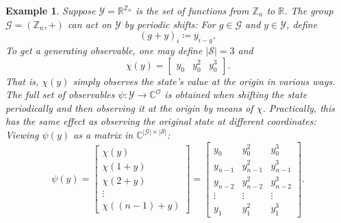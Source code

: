 \documentclass[preprint,12pt,authoryear]{elsarticle}
\newcommand{\Z}{\mathbb Z}
\newcommand{\R}{\mathbb{R}}
\newcommand{\C}{\mathbb{C}}
\newcommand\Gc{\mathcal G}
\newcommand\Oc{\mathcal O}
\newcommand\Yc{\mathcal Y}
\newcommand\Sc{\mathcal S}
\newtheorem{example}{Example}[section]%
\begin{document}
{\begin{example}
    \label{ex:generating-observable}
    Suppose $\Yc = \R^{\Z_n}$ is the set of functions from $\Z_n$ to $\R$. The group $\Gc = (\Z_n,+)$ can act on $\Yc$ by periodic shifts: For $g \in \Gc$ and $y \in \Yc$, define
    $$
        (g + y)_i \coloneqq y_{i-g},
    $$
    To get a generating observable, one may define $|\Sc| = 3$ and
    $$
        \chi(y) = \begin{bmatrix}
            y_0 & y_0^2 & y_0^3
        \end{bmatrix}.
    $$
    That is, $\chi(y)$ simply observes the state's value at the origin in various ways.
    The full set of observables $\psi : \Yc \rightarrow \C^\Oc$ is obtained when shifting the state periodically and then observing it at the origin by means of $\chi$. Practically, this has the same effect as observing the original state at different coordinates: Viewing $\psi(y)$ as a matrix in $\C^{|\Gc| \times |\Sc|}$:
    $$
        \psi(y) = \begin{bmatrix}
            \chi(y) \\ \chi( 1 + y ) \\ \chi( 2 + y ) \\ \vdots \\ \chi( (n-1) + y) 
        \end{bmatrix} 
        = \begin{bmatrix}
            y_0   & y_0^2 & y_0^3 \\
            y_{n-1} & y_{n-1}^2 & y_{n-1}^3 \\
            y_{n-2} & y_{n-2}^2 & y_{n-2}^3 \\
            \vdots & \vdots & \vdots \\
            y_{1} & y_1^2 & y_1^3
        \end{bmatrix}.
    $$
\end{example}

}
\end{document}
